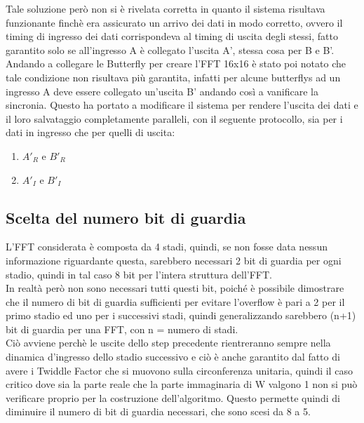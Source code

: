 \documentclass[a4paper, titlepage]{article}
\begin{document}
 Tale soluzione però non si è rivelata corretta in quanto il sistema risultava funzionante finchè era assicurato un arrivo dei dati in modo corretto, ovvero il timing di ingresso dei dati corrispondeva al timing di uscita degli stessi, fatto garantito solo se all'ingresso A è collegato l'uscita A', stessa cosa per B e B'. Andando a collegare le Butterfly per creare l'FFT 16x16 è stato poi notato che tale condizione non risultava più garantita, infatti per alcune butterflys ad un ingresso A deve essere collegato un'uscita B' andando così a vanificare la sincronia. Questo ha portato a modificare il sistema per rendere l'uscita dei dati e il loro salvataggio completamente paralleli, con il seguente protocollo, sia per i dati in ingresso che per quelli di uscita:
\begin{enumerate}
\item $A'_R$ e $B'_R$
\item $A'_I$ e $B'_I$
\end{enumerate}
 \subsection{Scelta del numero bit di guardia} %
L'FFT considerata è composta da 4 stadi, quindi, se non fosse data nessun informazione riguardante questa, sarebbero necessari 2 bit di guardia per ogni stadio, quindi in tal caso 8 bit per l'intera struttura dell'FFT.\\In realtà però non sono necessari tutti questi bit, poiché è possibile dimostrare che il numero di bit di guardia sufficienti per evitare l'overflow è pari a 2 per il primo stadio ed uno per i successivi stadi, quindi generalizzando sarebbero (n+1) bit di guardia per una FFT, con n = numero di stadi.
\\Ciò avviene perchè le uscite dello step precedente rientreranno sempre nella dinamica d'ingresso dello stadio successivo e ciò è anche garantito dal fatto di avere i Twiddle Factor che si muovono sulla circonferenza unitaria, quindi il caso critico dove sia la parte reale che la parte immaginaria di W valgono 1 non si può verificare proprio per la costruzione dell'algoritmo. Questo permette quindi di diminuire il numero di bit di guardia necessari, che sono scesi da 8 a 5.
\end{document}
